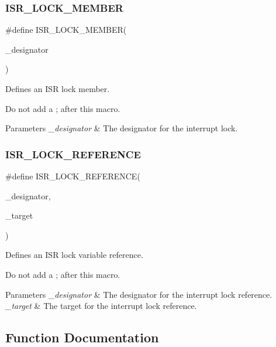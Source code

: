 \subsubsection{\texorpdfstring{ISR\_LOCK\_MEMBER}{ISR\_LOCK\_MEMBER}}
{\footnotesize\ttfamily \#define I\+S\+R\+\_\+\+L\+O\+C\+K\+\_\+\+M\+E\+M\+B\+ER(\begin{DoxyParamCaption}\item[{}]{\+\_\+designator }\end{DoxyParamCaption})}



Defines an I\+SR lock member. 

Do not add a \textquotesingle{};\textquotesingle{} after this macro.


\begin{DoxyParams}{Parameters}
{\em \+\_\+designator} & The designator for the interrupt lock. \\
\hline
\end{DoxyParams}
\mbox{\label{group__RTEMSScoreISRLocks_gad41ddc507bfa7022bd9355ff252888d2}} 
\subsubsection{\texorpdfstring{ISR\_LOCK\_REFERENCE}{ISR\_LOCK\_REFERENCE}}
{\footnotesize\ttfamily \#define I\+S\+R\+\_\+\+L\+O\+C\+K\+\_\+\+R\+E\+F\+E\+R\+E\+N\+CE(\begin{DoxyParamCaption}\item[{}]{\+\_\+designator,  }\item[{}]{\+\_\+target }\end{DoxyParamCaption})}



Defines an I\+SR lock variable reference. 

Do not add a \textquotesingle{};\textquotesingle{} after this macro.


\begin{DoxyParams}{Parameters}
{\em \+\_\+designator} & The designator for the interrupt lock reference. \\
\hline
{\em \+\_\+target} & The target for the interrupt lock reference. \\
\hline
\end{DoxyParams}


\subsection{Function Documentation}
\mbox{\label{group__RTEMSScoreISRLocks_ga937f2866844702a8e85148bcdc4d49d0}} 
